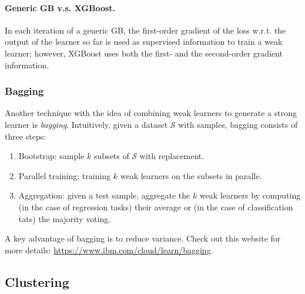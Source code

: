         \paragraph{Generic GB v.s. XGBoost.}
        In each iteration of a generic GB, the first-order gradient of the loss w.r.t. the output of the learner so far is used as supervised information to train a weak learner; however, XGBoost uses both the first- and the second-order gradient information.
        
        
        
        
    
        
    
    
    
\subsubsection{Bagging}

Another technique with the idea of combining weak learners to generate a strong learner is \emph{bagging}.
Intuitively, given a dataset $\mathcal{S}$ with \ndata samples, bagging consists of three steps:
    \begin{enumerate}
        \item Bootstrap: sample $k$ subsets of $\mathcal{S}$ with replacement. 
        \item Parallel training: training $k$ weak learners on the subsets in paralle. 
        \item Aggregation: given a test sample, aggregate the $k$ weak learners by computing (in the case of regression tasks) their average or (in the case of classification tats) the majority voting.
    \end{enumerate}
A key advantage of bagging is to reduce variance.
Check out this website for more details: \url{https://www.ibm.com/cloud/learn/bagging}.



\subsection{Clustering}
